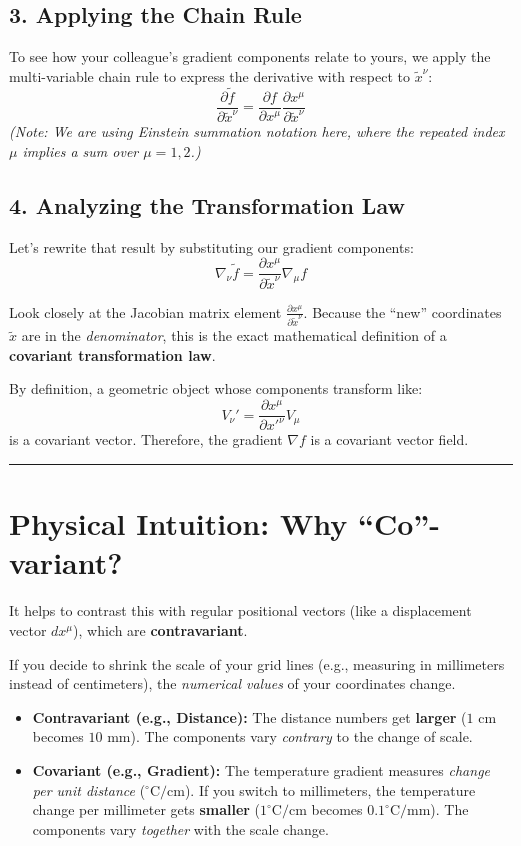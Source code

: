 \documentclass[11pt,a4paper]{article}
\begin{document}
	\subsection*{3. Applying the Chain Rule}
	To see how your colleague's gradient components relate to yours, we apply the multi-variable chain rule to express the derivative with respect to $\tilde{x}^\nu$:
	\[
	\frac{\partial \tilde{f}}{\partial \tilde{x}^\nu} = \frac{\partial f}{\partial x^\mu} \frac{\partial x^\mu}{\partial \tilde{x}^\nu}
	\]
	\textit{(Note: We are using Einstein summation notation here, where the repeated index $\mu$ implies a sum over $\mu = 1, 2$.)}
	
	\subsection*{4. Analyzing the Transformation Law}
	Let's rewrite that result by substituting our gradient components:
	\[
	\nabla_\nu \tilde{f} = \frac{\partial x^\mu}{\partial \tilde{x}^\nu} \nabla_\mu f
	\]
	
	Look closely at the Jacobian matrix element $\frac{\partial x^\mu}{\partial \tilde{x}^\nu}$. Because the ``new'' coordinates $\tilde{x}$ are in the \textit{denominator}, this is the exact mathematical definition of a \textbf{covariant transformation law}. 
	
	By definition, a geometric object whose components transform like:
	\[
	V_\nu' = \frac{\partial x^\mu}{\partial x'^\nu} V_\mu
	\]
	is a covariant vector. Therefore, the gradient $\nabla f$ is a covariant vector field.
	
	\medskip
	\hrule
	\medskip
	
	\section*{Physical Intuition: Why ``Co''-variant?}
	
	It helps to contrast this with regular positional vectors (like a displacement vector $dx^\mu$), which are \textbf{contravariant}. 
	
	If you decide to shrink the scale of your grid lines (e.g., measuring in millimeters instead of centimeters), the \textit{numerical values} of your coordinates change. 
	
	\begin{itemize}
		\item \textbf{Contravariant (e.g., Distance):} The distance numbers get \textbf{larger} ($1\text{ cm}$ becomes $10\text{ mm}$). The components vary \textit{contrary} to the change of scale.
		\item \textbf{Covariant (e.g., Gradient):} The temperature gradient measures \textit{change per unit distance} ($^\circ\text{C}/\text{cm}$). If you switch to millimeters, the temperature change per millimeter gets \textbf{smaller} ($1^\circ\text{C}/\text{cm}$ becomes $0.1^\circ\text{C}/\text{mm}$). The components vary \textit{together} with the scale change.
	\end{itemize}
	
\end{document}
